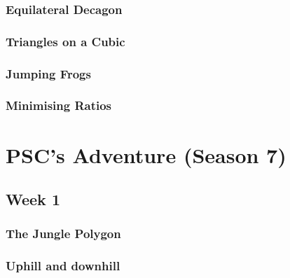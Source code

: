 \documentclass[titlepage=true]{scrartcl}
\begin{document}
        \subsubsection{Equilateral Decagon}
            \label{6.2.4}
            
        \newpage

        \subsubsection{Triangles on a Cubic} 
            \label{6.2.5}
            
        \newpage

        \subsubsection{Jumping Frogs}
            \label{6.2.6}
            
        \newpage 

        \subsubsection{Minimising Ratios}
            \label{6.2.7}
            
        \newpage

\section{PSC's Adventure (Season 7)}

	\subsection{Week 1}
	
    \subsubsection{The Jungle Polygon}
		\label{7.1.1}
		
        \newpage
        
        \subsubsection{Uphill and downhill}
        \label{7.1.2}  
        
    \newpage
		
		
\end{document}
